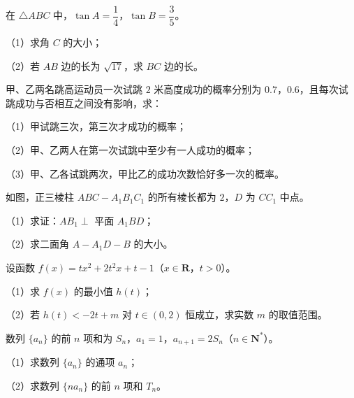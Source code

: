 \begin{question}
在 $\triangle ABC$ 中，$\tan A=\dfrac14$，$\tan B=\dfrac35$。

（1）求角 $C$ 的大小；

（2）若 $AB$ 边的长为 $\sqrt{17}$，求 $BC$ 边的长。

\end{question}
\begingroup
\renewenvironment{question}{\Needspace{0.44\textheight}}{}
\begin{question}
甲、乙两名跳高运动员一次试跳 $2$ 米高度成功的概率分别为 $0.7$，$0.6$，且每次试跳成功与否相互之间没有影响，求：

（1）甲试跳三次，第三次才成功的概率；

（2）甲、乙两人在第一次试跳中至少有一人成功的概率；

（3）甲、乙各试跳两次，甲比乙的成功次数恰好多一次的概率。

\Needspace{0.4\textheight}
\end{question}
\endgroup
\begin{question}
如图，正三棱柱 $ABC-A_1B_1C_1$ 的所有棱长都为 $2$，$D$ 为 $CC_1$ 中点。

（1）求证：$AB_1\perp$ 平面 $A_1BD$；

（2）求二面角 $A-A_1D-B$ 的大小。
\nopagebreak[4]
\begin{center}\end{center}
\nopagebreak[4]
\end{question}
\begin{question}
设函数 $f(x)=tx^2+2t^2x+t-1$（$x\in\mathbf R$，$t>0$）。

（1）求 $f(x)$ 的最小值 $h(t)$；

（2）若 $h(t)<-2t+m$ 对 $t\in(0,2)$ 恒成立，求实数 $m$ 的取值范围。

\end{question}
\begingroup
\renewenvironment{question}{\Needspace{0.4\textheight}}{}
\begin{question}
数列 $\{a_n\}$ 的前 $n$ 项和为 $S_n$，$a_1=1$，$a_{n+1}=2S_n$（$n\in\mathbf N^*$）。

（1）求数列 $\{a_n\}$ 的通项 $a_n$；

（2）求数列 $\{na_n\}$ 的前 $n$ 项和 $T_n$。

\Needspace{0.4\textheight}
\end{question}
\endgroup
